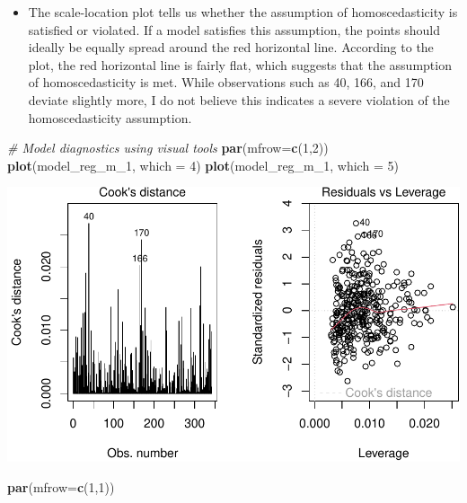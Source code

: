 \documentclass[
]{book}
\newenvironment{Shaded}{\begin{snugshade}}{\end{snugshade}}
\newcommand{\AttributeTok}[1]{\textcolor[rgb]{0.13,0.29,0.53}{#1}}
\newcommand{\CommentTok}[1]{\textcolor[rgb]{0.56,0.35,0.01}{\textit{#1}}}
\newcommand{\DecValTok}[1]{\textcolor[rgb]{0.00,0.00,0.81}{#1}}
\newcommand{\FunctionTok}[1]{\textcolor[rgb]{0.13,0.29,0.53}{\textbf{#1}}}
\newcommand{\NormalTok}[1]{#1}
\providecommand{\tightlist}{%
  \setlength{\itemsep}{0pt}\setlength{\parskip}{0pt}}
\begin{document}
\begin{itemize}
\tightlist
\item
  The scale-location plot tells us whether the assumption of homoscedasticity is satisfied or violated. If a model satisfies this assumption, the points should ideally be equally spread around the red horizontal line. According to the plot, the red horizontal line is fairly flat, which suggests that the assumption of homoscedasticity is met. While observations such as 40, 166, and 170 deviate slightly more, I do not believe this indicates a severe violation of the homoscedasticity assumption.
\end{itemize}

\begin{Shaded}
\begin{Highlighting}[]
\CommentTok{\# Model diagnostics using visual tools}
\FunctionTok{par}\NormalTok{(}\AttributeTok{mfrow=}\FunctionTok{c}\NormalTok{(}\DecValTok{1}\NormalTok{,}\DecValTok{2}\NormalTok{))}
\FunctionTok{plot}\NormalTok{(model\_reg\_m\_1, }\AttributeTok{which =} \DecValTok{4}\NormalTok{)}
\FunctionTok{plot}\NormalTok{(model\_reg\_m\_1, }\AttributeTok{which =} \DecValTok{5}\NormalTok{)}
\end{Highlighting}
\end{Shaded}

\includegraphics{PSY202A-Modeling-I.Heo_files/figure-latex/unnamed-chunk-121-1.pdf}

\begin{Shaded}
\begin{Highlighting}[]
\FunctionTok{par}\NormalTok{(}\AttributeTok{mfrow=}\FunctionTok{c}\NormalTok{(}\DecValTok{1}\NormalTok{,}\DecValTok{1}\NormalTok{))}
\end{Highlighting}
\end{Shaded}
\end{document}
